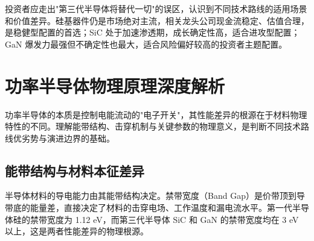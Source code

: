 \begin{keyinsight}[技术路线投资启示]
投资者应走出"第三代半导体将替代一切"的误区，认识到不同技术路线的适用场景和价值差异。硅基器件仍是市场绝对主流，相关龙头公司现金流稳定、估值合理，是稳健型配置的首选；SiC 处于加速渗透期，成长确定性高，适合进攻型配置；GaN 爆发力最强但不确定性也最大，适合风险偏好较高的投资者主题配置。
\end{keyinsight}

\section{功率半导体物理原理深度解析}

功率半导体的本质是控制电能流动的"电子开关"，其性能差异的根源在于材料物理特性的不同。理解能带结构、击穿机制与关键参数的物理意义，是判断不同技术路线优劣势与演进边界的基础。

\subsection{能带结构与材料本征差异}

半导体材料的导电能力由其能带结构决定。禁带宽度（Band Gap）是价带顶到导带底的能量差，直接决定了材料的击穿电场、工作温度和漏电流水平。第一代半导体硅的禁带宽度为 1.12 eV，而第三代半导体 SiC 和 GaN 的禁带宽度均在 3 eV 以上，这是两者性能差异的物理根源。

